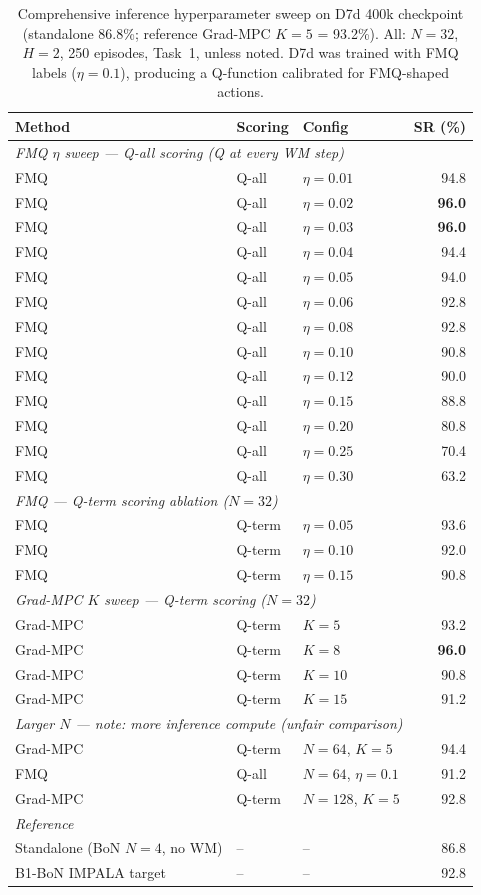 \documentclass[11pt]{article}
\newcommand{\best}[1]{\textbf{#1}}
\begin{document}
\begin{table}[h]
\centering
\caption{Comprehensive inference hyperparameter sweep on D7d 400k checkpoint
  (standalone 86.8\%; reference Grad-MPC $K=5$ = 93.2\%).
  All: $N=32$, $H=2$, 250 episodes, Task~1, unless noted.
  D7d was trained with FMQ labels ($\eta=0.1$), producing a Q-function calibrated
  for FMQ-shaped actions.}
\begin{tabular}{lllr}
\toprule
Method & Scoring & Config & SR (\%) \\
\midrule
\multicolumn{4}{l}{\textit{FMQ $\eta$ sweep --- Q-all scoring (Q at every WM step)}} \\
FMQ & Q-all & $\eta=0.01$ & 94.8 \\
FMQ & Q-all & $\eta=0.02$ & \best{96.0} \\
FMQ & Q-all & $\eta=0.03$ & \best{96.0} \\
FMQ & Q-all & $\eta=0.04$ & 94.4 \\
FMQ & Q-all & $\eta=0.05$ & 94.0 \\
FMQ & Q-all & $\eta=0.06$ & 92.8 \\
FMQ & Q-all & $\eta=0.08$ & 92.8 \\
FMQ & Q-all & $\eta=0.10$ & 90.8 \\
FMQ & Q-all & $\eta=0.12$ & 90.0 \\
FMQ & Q-all & $\eta=0.15$ & 88.8 \\
FMQ & Q-all & $\eta=0.20$ & 80.8 \\
FMQ & Q-all & $\eta=0.25$ & 70.4 \\
FMQ & Q-all & $\eta=0.30$ & 63.2 \\
\midrule
\multicolumn{4}{l}{\textit{FMQ --- Q-term scoring ablation ($N=32$)}} \\
FMQ & Q-term & $\eta=0.05$ & 93.6 \\
FMQ & Q-term & $\eta=0.10$ & 92.0 \\
FMQ & Q-term & $\eta=0.15$ & 90.8 \\
\midrule
\multicolumn{4}{l}{\textit{Grad-MPC $K$ sweep --- Q-term scoring ($N=32$)}} \\
Grad-MPC & Q-term & $K=5$  & 93.2 \\
Grad-MPC & Q-term & $K=8$  & \best{96.0} \\
Grad-MPC & Q-term & $K=10$ & 90.8 \\
Grad-MPC & Q-term & $K=15$ & 91.2 \\
\midrule
\multicolumn{4}{l}{\textit{Larger $N$ --- note: more inference compute (unfair comparison)}} \\
Grad-MPC & Q-term & $N=64$, $K=5$      & 94.4 \\
FMQ      & Q-all  & $N=64$, $\eta=0.1$ & 91.2 \\
Grad-MPC & Q-term & $N=128$, $K=5$     & 92.8 \\
\midrule
\multicolumn{4}{l}{\textit{Reference}} \\
Standalone (BoN $N=4$, no WM) & -- & -- & 86.8 \\
B1-BoN IMPALA target          & -- & -- & 92.8 \\
\bottomrule
\end{tabular}
\end{table}
\end{document}
